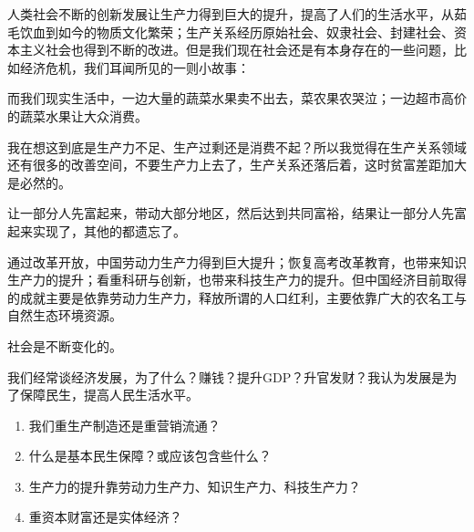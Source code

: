 \documentclass[UTF9]{ctexart}
\begin{document}
人类社会不断的创新发展让生产力得到巨大的提升，提高了人们的生活水平，从茹毛饮血到如今的物质文化繁荣；生产关系经历原始社会、奴隶社会、封建社会、资本主义社会也得到不断的改进。但是我们现在社会还是有本身存在的一些问题，比如经济危机，我们耳闻所见的一则小故事：

\begin{quote}




\end{quote}

而我们现实生活中，一边大量的蔬菜水果卖不出去，菜农果农哭泣；一边超市高价的蔬菜水果让大众消费。

我在想这到底是生产力不足、生产过剩还是消费不起？所以我觉得在生产关系领域还有很多的改善空间，不要生产力上去了，生产关系还落后着，这时贫富差距加大是必然的。

让一部分人先富起来，带动大部分地区，然后达到共同富裕，结果让一部分人先富起来实现了，其他的都遗忘了。


\begin{quote}
\end{quote}

通过改革开放，中国劳动力生产力得到巨大提升；恢复高考改革教育，也带来知识生产力的提升；看重科研与创新，也带来科技生产力的提升。但中国经济目前取得的成就主要是依靠劳动力生产力，释放所谓的人口红利，主要依靠广大的农名工与自然生态环境资源。

社会是不断变化的。

\begin{quote}
\end{quote}

我们经常谈经济发展，为了什么？赚钱？提升GDP？升官发财？我认为发展是为了保障民生，提高人民生活水平。

\begin{enumerate}
\item 我们重生产制造还是重营销流通？
\item 什么是基本民生保障？或应该包含些什么？
\item 生产力的提升靠劳动力生产力、知识生产力、科技生产力？
\item 重资本财富还是实体经济？
\end{enumerate}
\end{document}
